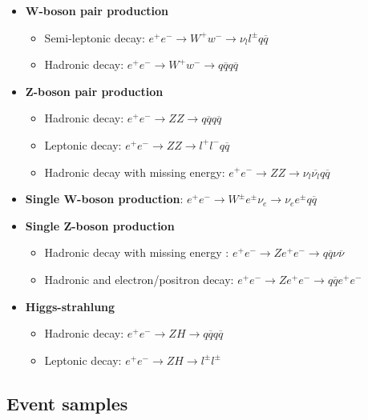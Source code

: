    \begin{itemize}
      \item \textbf{W-boson pair production}
      \begin{itemize}
        \item Semi-leptonic decay: $e^{+}e^{-} \rightarrow W^+w^- \rightarrow \nu_{l}l^{\pm}q\overline{q}$
        \item Hadronic decay: $e^{+}e^{-} \rightarrow W^+w^- \rightarrow q\overline{q} q\overline{q}$
      \end{itemize}
      \item \textbf{Z-boson pair production}
      \begin{itemize}
        \item Hadronic decay: $e^+e^- \rightarrow ZZ \rightarrow q\overline{q} q\overline{q}$
        \item Leptonic decay: $e^+e^- \rightarrow ZZ \rightarrow l^+l^- q\overline{q}$
        \item Hadronic decay with missing energy:  $e^+e^- \rightarrow ZZ \rightarrow \nu_{l}\overline{\nu_{l}}q \overline{q}$
      \end{itemize}
      \item \textbf{Single W-boson production}: $e^+e^- \rightarrow W^{\pm}e^{\pm}\nu_{e} \rightarrow \nu_{e}e^{\pm}q\overline{q}$
      \item \textbf{Single Z-boson production}
      \begin{itemize}
        \item Hadronic decay with missing energy : $e^+e^- \rightarrow Z e^+e^- \rightarrow q\overline{q} \nu \overline{\nu}$
        \item Hadronic and electron/positron decay: $e^+e^- \rightarrow Z e^+e^- \rightarrow q\overline{q} e^+e^-$
      \end{itemize}
      \item \textbf{Higgs-strahlung}
      \begin{itemize}
        \item Hadronic decay: $e^+e^- \rightarrow ZH \rightarrow q\overline{q} q\overline{q}$
        \item Leptonic decay: $e^+e^- \rightarrow ZH \rightarrow l^{\pm}l^{\pm}$
      \end{itemize}
   \end{itemize}

   \subsection{Event samples}

